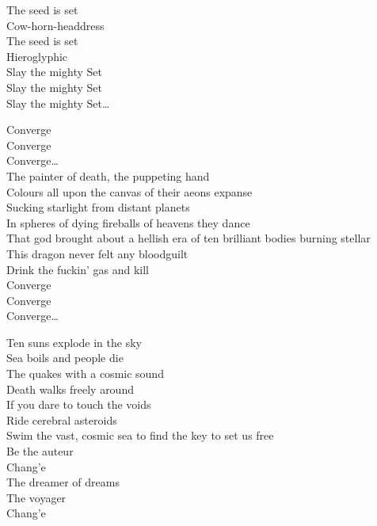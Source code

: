The seed is set\\
Cow-horn-headdress\\
The seed is set\\
Hieroglyphic\\

Slay the mighty Set\\
Slay the mighty Set\\
Slay the mighty Set…\\


Converge\\
Converge\\
Converge…\\

The painter of death, the puppeting hand\\
Colours all upon the canvas of their aeons expanse\\
Sucking starlight from distant planets\\
In spheres of dying fireballs of heavens they dance\\

That god brought about a hellish era of ten brilliant bodies burning stellar\\
This dragon never felt any bloodguilt\\
Drink the fuckin' gas and kill\\

Converge\\
Converge\\
Converge…\\



Ten suns explode in the sky\\
Sea boils and people die\\
The  quakes with a cosmic sound\\
Death walks freely around\\
If you dare to touch the voids\\
Ride cerebral asteroids\\
Swim the vast, cosmic sea to find the key to set us free\\

Be the auteur\\
Chang'e\\
The dreamer of dreams\\
The voyager\\
Chang'e\\

